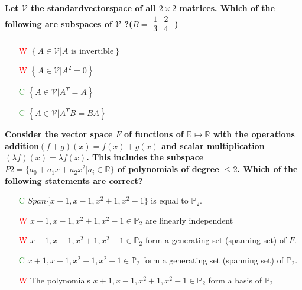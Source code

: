 \documentclass[7pt,landscape, margin = 0.1mm]{article}
\begin{document}
\begin{multicols}{4}
\begin{flushleft}
\textbf{ Let $\mathcal{V} $ the standardvectorspace of all $2 \times 2 $ matrices. Which of the following are subspaces of $\mathcal{V} $ ?($B = \begin{smallmatrix}
 1& 2 \\
 3&4  \\
\end{smallmatrix}$ )}
\begin{itemize}
\item[\textcolor{red}{W}]  $\left\{A \in \mathcal{V} | A \text{ is invertible} \right\}$ 
\item[\textcolor{red}{W}] $\left\{A \in \mathcal{V} | A^2 = 0 \right\}$
\item[\textcolor{green}{C}] $\left\{A \in \mathcal{V} | A^T = A \right\}$ 
\item[\textcolor{green}{C}]  $\left\{A \in \mathcal{V} | A^T B= BA \right\}$
\end{itemize}
\hspace{3mm}

\textbf{ Consider the vector space $F$ of functions of $\mathbb{R} \mapsto \mathbb{R}$ with the operations addition$ (f + g)(x) =
f(x)+g(x)$ and scalar multiplication $(\lambda f)(x) = \lambda f(x)$. This includes the subspace $P2 = \{a_0 +a_1 x+
a_2 x^2 | a_i \in \mathbb{R} \} $ of polynomials of degree $\leq 2$. Which of the following statements are correct? }
\begin{itemize}
\item[\textcolor{green}{C}] $ Span\{x + 1, x - 1, x^2 + 1, x^2 - 1\}$ is equal to $\mathbb{P}_2$.
\item[\textcolor{red}{W}] $x + 1, x - 1, x^2 + 1, x^2 - 1 \in \mathbb{P}_2$ are linearly independent
\item[\textcolor{red}{W}]  $x + 1, x - 1, x^2 + 1, x^2 - 1 \in \mathbb{P}_2$ form a generating set (spanning set) of $F$.
\item[\textcolor{green}{C}]   $x + 1, x - 1, x^2 + 1, x^2 - 1 \in \mathbb{P}_2$ form a generating set (spanning set) of $\mathbb{P}_2$.
\item[\textcolor{red}{W}] The polynomials $x + 1, x - 1, x^2 + 1, x^2 - 1 \in \mathbb{P}_2$ form a basis of $\mathbb{P}_2$
\end{itemize}
\hspace{3mm}


\end{flushleft}
\end{multicols}
\end{document}
